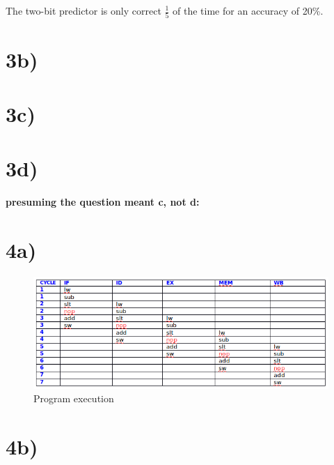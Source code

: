 \documentclass[a4paper,11pt]{article}
\begin{document}
The two-bit predictor is only correct $\frac{1}{5}$ of the time for an accuracy of 20\%.

\section*{3b)}

\section*{3c)}

\section*{3d)}
{\bf presuming the question meant c, not d:}


\section*{4a)}

\begin{figure}[h!]
\caption{Program execution} 
\centering
\includegraphics[width=1.1\textwidth]{hw7_p4a.png}
\end{figure}

\section*{4b)}


\end{document}

